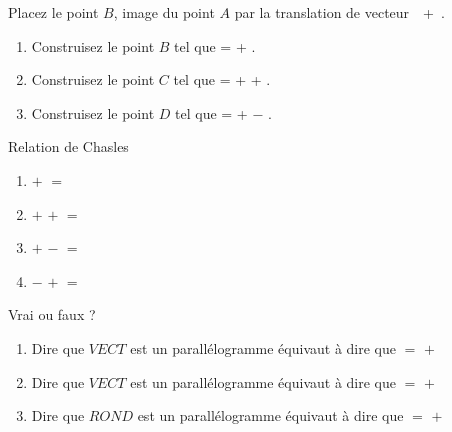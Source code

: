 \exercice Placez le point $B$, image du point $A$ par la translation de vecteur~~+~.


\exercice	\begin{enumerate}
				\item Construisez le point $B$ tel que  =  + .
				\item Construisez le point $C$ tel que  =  +  + .
				\item Construisez le point $D$ tel que  =  +  $-$ .\\
			\end{enumerate}



\exercice Relation de Chasles

\begin{enumerate}
	\item {} $+$  $=$ 
	\item {} $+$  $+$  $=$ 
	\item {} $+$  $-$  $=$ 
	\item {} $-$  $+$  $=$ 
\end{enumerate}

\exercice Vrai ou faux ?
	\begin{enumerate}
		\item Dire que $VECT$ est un parallélogramme équivaut à dire que  $=$  $+$ 
		\item Dire que $VECT$ est un parallélogramme équivaut à dire que  $=$  $+$ 
		\item Dire que $ROND$ est un parallélogramme équivaut à dire que  $=$  $+$ 
	\end{enumerate}

